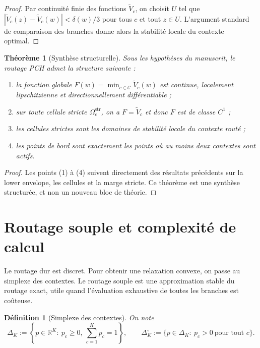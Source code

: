 \documentclass[11pt,a4paper]{article}
\newtheorem{definition}{Définition}[section]
\newtheorem{theorem}{Théorème}[section]
\newcommand{\R}{\mathbb R}
\newcommand{\Ccal}{\mathcal C}
\begin{document}
\begin{proof}
Par continuité finie des fonctions \(\widetilde V_c\), on choisit \(U\) tel que \(|\widetilde V_c(z)-\widetilde V_c(w)|<\delta(w)/3\) pour tous \(c\) et tout \(z\in U\). L'argument standard de comparaison des branches donne alors la stabilité locale du contexte optimal.
\end{proof}

\begin{theorem}[Synthèse structurelle]
Sous les hypothèses du manuscrit, le routage PCH admet la structure suivante :
\begin{enumerate}[leftmargin=2em]
\item la fonction globale \(F(w)=\min_{c\in\Ccal}\widetilde V_c(w)\) est continue, localement lipschitzienne et directionnellement différentiable ;
\item sur toute cellule stricte \(\Omega_c^{\mathrm{str}}\), on a \(F=\widetilde V_c\) et donc \(F\) est de classe \(C^1\) ;
\item les cellules strictes sont les domaines de stabilité locale du contexte routé ;
\item les points de bord sont exactement les points où au moins deux contextes sont actifs.
\end{enumerate}
\end{theorem}

\begin{proof}
Les points (1) à (4) suivent directement des résultats précédents sur la lower envelope, les cellules et la marge stricte. Ce théorème est une synthèse structurée, et non un nouveau bloc de théorie.
\end{proof}

\section{Routage souple et complexité de calcul}

Le routage dur est discret. Pour obtenir une relaxation convexe, on passe au simplexe des contextes. Le routage souple est une approximation stable du routage exact, utile quand l'évaluation exhaustive de toutes les branches est coûteuse.

\begin{definition}[Simplexe des contextes]
On note
\[
\Delta_K:=\left\{p\in\R^K:\ p_c\ge 0,\ \sum_{c=1}^K p_c=1\right\},
\qquad
\Delta_K^\circ:=\{p\in\Delta_K:\ p_c>0\ \text{pour tout }c\}.
\]
\end{definition}
\end{document}
